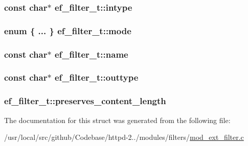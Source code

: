 \subsubsection[{\texorpdfstring{intype}{intype}}]{\setlength{\rightskip}{0pt plus 5cm}const char$\ast$ ef\+\_\+filter\+\_\+t\+::intype}\hypertarget{structef__filter__t_a96f28a60912c4b94c04336a15cf99290}{}\label{structef__filter__t_a96f28a60912c4b94c04336a15cf99290}
\subsubsection[{\texorpdfstring{mode}{mode}}]{\setlength{\rightskip}{0pt plus 5cm}enum \{ ... \}   ef\+\_\+filter\+\_\+t\+::mode}\hypertarget{structef__filter__t_ac7d0ba42efc7b1756f14897135659964}{}\label{structef__filter__t_ac7d0ba42efc7b1756f14897135659964}
\subsubsection[{\texorpdfstring{name}{name}}]{\setlength{\rightskip}{0pt plus 5cm}const char$\ast$ ef\+\_\+filter\+\_\+t\+::name}\hypertarget{structef__filter__t_a3d8059dee2d4b959f5d1fce3480484fc}{}\label{structef__filter__t_a3d8059dee2d4b959f5d1fce3480484fc}
\subsubsection[{\texorpdfstring{outtype}{outtype}}]{\setlength{\rightskip}{0pt plus 5cm}const char$\ast$ ef\+\_\+filter\+\_\+t\+::outtype}\hypertarget{structef__filter__t_ab9703641087ddf2ed6c4290efae623be}{}\label{structef__filter__t_ab9703641087ddf2ed6c4290efae623be}
\subsubsection[{\texorpdfstring{preserves\+\_\+content\+\_\+length}{preserves_content_length}}]{ ef\+\_\+filter\+\_\+t\+::preserves\+\_\+content\+\_\+length}\hypertarget{structef__filter__t_a11eb1142226f16c3d4d76a339af4148b}{}\label{structef__filter__t_a11eb1142226f16c3d4d76a339af4148b}


The documentation for this struct was generated from the following file\+:\begin{DoxyCompactItemize}
\item 
/usr/local/src/github/\+Codebase/httpd-\/2../modules/filters/\hyperlink{mod__ext__filter_8c}{mod\+\_\+ext\+\_\+filter.\+c}\end{DoxyCompactItemize}
